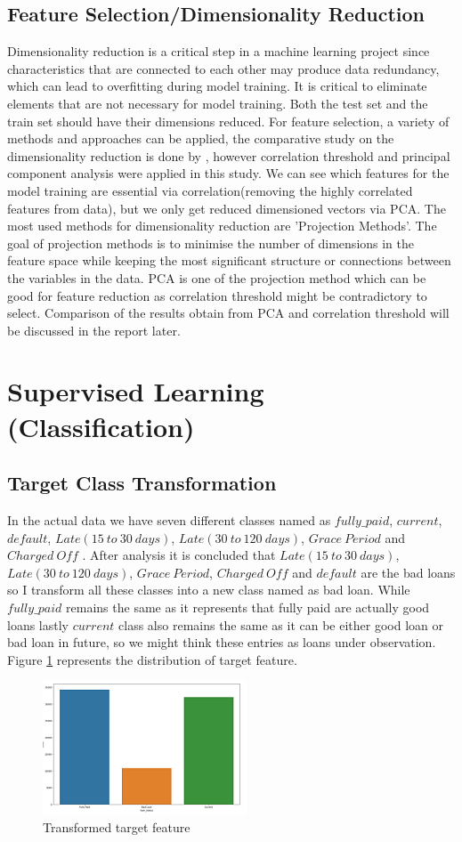 \documentclass[12pt]{article}
\begin{document}
\subsection{Feature Selection/Dimensionality Reduction}
Dimensionality reduction is a critical step in a machine learning project since characteristics that are connected to each other may produce data redundancy, which can lead to overfitting during model training. It is critical to eliminate elements that are not necessary for model training. Both the test set and the train set should have their dimensions reduced. For feature selection, a variety of methods and approaches can be applied, the comparative study on the dimensionality reduction is done by \citep{dimensionality}, however correlation threshold and principal component analysis were applied in this study. We can see which features for the model training are essential via correlation(removing the highly correlated features from data), but we only get reduced dimensioned vectors via PCA. The most used methods for dimensionality reduction are 'Projection Methods'. The goal of projection methods is to minimise the number of dimensions in the feature space while keeping the most significant structure or connections between the variables in the data. PCA is one of the projection method which can be good for feature reduction as correlation threshold might be contradictory to select. Comparison of the results obtain from PCA and correlation threshold will be discussed in the report later.


\section{Supervised Learning (Classification)}
\subsection{Target Class Transformation}
In the actual data we have seven different classes named as $fully\_paid$, $current$, $default$, $Late(15\ to\ 30\ days)$, $Late(30\ to\ 120\ days)$, $Grace\ Period$ and $Charged\ Off$ . After analysis it is concluded that $Late(15\ to\ 30\ days)$, $Late(30\ to\ 120\ days)$, $Grace\ Period$, $Charged\ Off$ and $default$ are the bad loans so I transform all these classes into a new class named as bad loan. While $fully\_paid$ remains the same as it represents that fully paid are actually good loans lastly $current$ class also remains the same as it can be either good loan or bad loan in future, so we might think these entries as loans under observation. Figure \ref{fig:new_classes} represents the distribution of target feature.
\begin{figure}[h!]
	\centering
	\includegraphics{classes.png}
	\caption{Transformed target feature}
	\label{fig:new_classes}
\end{figure}
\end{document}
